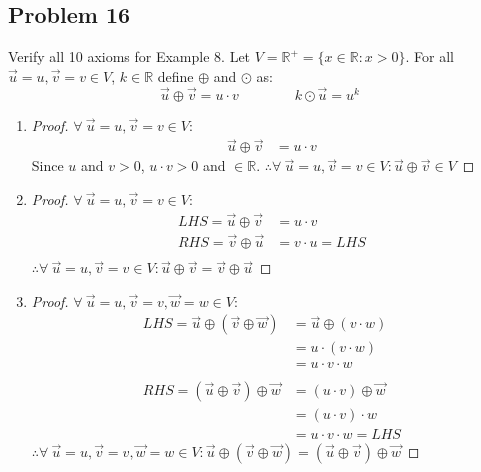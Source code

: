 \documentclass{article}
\newcommand{\bld}{\textbf}
\newcommand{\bb}{\mathbb}
\newcommand{\bitem}[1]{\item[\bld{#1.}]}
\begin{document}
\subsection*{Problem 16}
Verify all 10 axioms for Example 8. Let $V = \bb{R}^+ = \{x \in \bb{R}: x>0\}$. For all $\vec{u} = u,\vec{v} = v \in V$, $k\in \bb{R}$ define $\oplus$ and $\odot$ as:
\[
  \vec{u} \oplus \vec{v} = u \cdot v\qquad\qquad k \odot \vec{u} = u^k
\]
\begin{enumerate}
  \bitem{Axiom 1}
  \begin{proof}
    $\forall~\vec{u}=u,\vec{v}=v \in V$:
    \begin{align*}
      \vec{u} \oplus \vec{v} & = u \cdot v
    \end{align*}
    Since $u$ and $v > 0$, $u \cdot v > 0$ and $\in \bb{R}$. $\therefore \forall~\vec{u}=u,\vec{v}=v \in V: \vec{u} \oplus \vec{v} \in V$
  \end{proof}
  \bitem{Axiom 2}
  \begin{proof}
    $\forall~\vec{u}=u,\vec{v}=v \in V$:
    \begin{align*}
      LHS = \vec{u} \oplus \vec{v} & = u \cdot v       \\
      RHS = \vec{v} \oplus \vec{u} & = v \cdot u = LHS \\
    \end{align*}
    $\therefore \forall~\vec{u}=u,\vec{v}=v \in V: \vec{u} \oplus \vec{v} = \vec{v} \oplus \vec{u}$
  \end{proof}
  \bitem{Axiom 3}
  \begin{proof}
    $\forall~\vec{u}=u,\vec{v}=v,\vec{w}=w \in V$:
    \begin{align*}
      LHS = \vec{u} \oplus (\vec{v} \oplus \vec{w}) & = \vec{u} \oplus (v \cdot w) \\
                                                    & = u \cdot (v \cdot w)        \\
                                                    & = u \cdot v \cdot w          \\ \\
      RHS = (\vec{u} \oplus \vec{v}) \oplus \vec{w} & = (u \cdot v) \oplus \vec{w} \\
                                                    & = (u \cdot v) \cdot w        \\
                                                    & = u \cdot v \cdot w = LHS
    \end{align*}
    $\therefore \forall~\vec{u}=u,\vec{v}=v,\vec{w}=w \in V: \vec{u} \oplus (\vec{v} \oplus \vec{w}) = (\vec{u} \oplus \vec{v}) \oplus \vec{w}$

\end{proof}
\end{enumerate}
\end{document}

